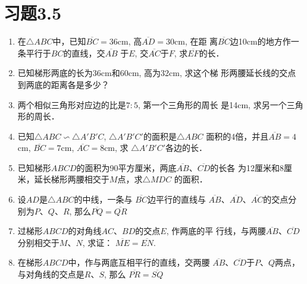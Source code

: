 \section*{习题3.5}
\begin{enumerate}
    \item 在$\triangle ABC$中，已知$\overline{BC}=36$cm, 高$\overline{AD}=30$cm, 在距
    离$\overline{BC}$边10cm的地方作一条平行于$BC$的直线，交$\overline{AB}$
    于$E$, 交$\overline{AC}$于$F$, 求$\overline{EF}$的长．
    \item 已知梯形两底的长为36cm和60cm, 高为32cm, 求这个梯
    形两腰延长线的交点到两底的距离各是多少？
    \item 两个相似三角形对应边的比是$7:5$, 第一个三角形的周长
    是14cm, 求另一个三角形的周长．
    \item 已知$\triangle ABC\backsim \triangle A'B'C$, $\triangle A'B'C'$的面积是$\triangle ABC$
    面积的4倍，并且$\overline{AB}=4$cm, $\overline{BC}=7$cm, $\overline{AC}=8$cm, 求
    $\triangle A'B'C'$各边的长．
    \item 已知梯形$ABCD$的面积为90平方厘米，两底$\overline{AB}$、$\overline{CD}$的长各
    为12厘米和8厘米，延长梯形两腰相交于$M$点，求$\triangle MDC$
    的面积．
    \item 设$AD$是$\triangle ABC$的中线，一条与
    $\overline{BC}$边平行的直线与
    $\overline{AB}$、$\overline{AD}$、$\overline{AC}$的交点分别为$P$、$Q$、$R$, 那么$\overline{PQ}=\overline{QR}$
    \item 过梯形$ABCD$的对角线$AC$、$BD$的交点$E$, 作两底的平
    行线，与两腰$\overline{AB}$、$\overline{CD}$分别相交于$M$、$N$, 求证：
    $\overline{ME}=\overline{EN}$.
    \item 在梯形$ABCD$中，作与两底互相平行的直线，交两腰
    $\overline{AB}$、$\overline{CD}$于$P$、$Q$两点，与对角线的交点是$R$、$S$, 那么
    $\overline{PR}=\overline{SQ}$
\end{enumerate}

